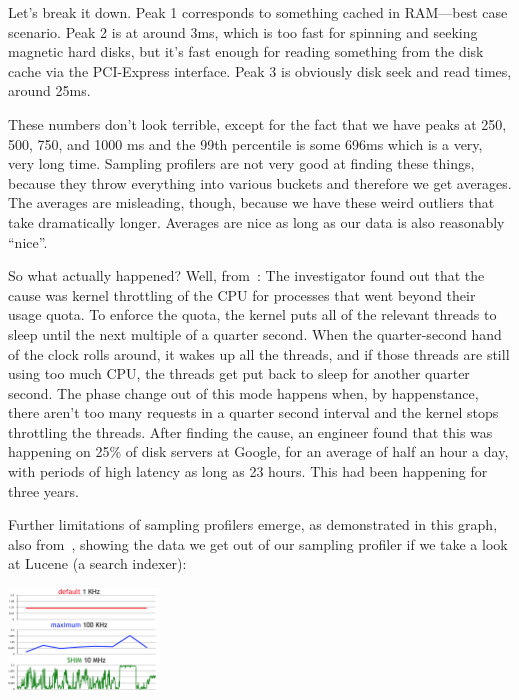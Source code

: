 Let's break it down. Peak 1 corresponds to something cached in RAM---best case scenario. Peak 2 is at around 3ms, which is too fast for spinning and seeking magnetic hard disks, but it's fast enough for reading something from the disk cache via the PCI-Express interface. Peak 3 is obviously disk seek and read times, around 25ms. 

These numbers don't look terrible, except for the fact that we have peaks at 250, 500, 750, and 1000 ms and the 99th percentile is some 696ms which is a very, very long time. Sampling profilers are not very good at finding these things, because they throw everything into various buckets and therefore we get averages. The averages are misleading, though, because we have these weird outliers that take dramatically longer. Averages are nice as long as our data is also reasonably ``nice''.

So what actually happened? Well, from~\cite{perf-tracing}: The investigator found out that the cause was kernel throttling of the CPU for processes that went beyond their usage quota. To enforce the quota, the kernel puts all of the relevant threads to sleep until the next multiple of a quarter second. When the quarter-second hand of the clock rolls around, it wakes up all the threads, and if those threads are still using too much CPU, the threads get put back to sleep for another quarter second. The phase change out of this mode happens when, by happenstance, there aren't too many requests in a quarter second interval and the kernel stops throttling the threads. After finding the cause, an engineer found that this was happening on 25\% of disk servers at Google, for an average of half an hour a day, with periods of high latency as long as 23 hours. This had been happening for three years.

Further limitations of sampling profilers emerge, as demonstrated in this graph, also from~\cite{perf-tracing}, showing the data we get out of our sampling profiler if we take a look at Lucene (a search indexer):

\begin{center}
	\includegraphics[width=0.3\textwidth]{images/perf-sample.png}
\end{center}


